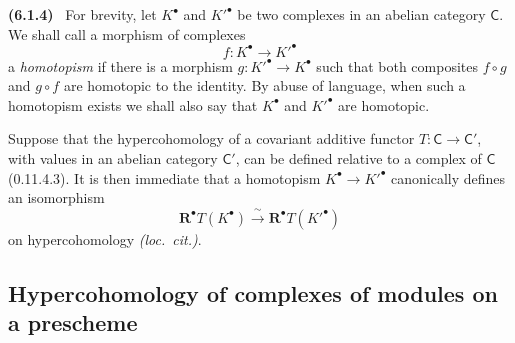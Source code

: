 \documentclass[10pt,oneside]{book}
\newcommand{\sref}[2][]{(#2)}
\newenvironment{env}[1][]{\par\medskip\noindent\textbf{(#1)}\ }{\par}
\begin{document}
\begin{env}[6.1.4]
\label{III.6.1.4}
For brevity, let $K^\bullet$ and $K'^\bullet$ be two complexes in
an abelian category $\mathsf{C}$.  We shall call a morphism of
complexes
\[
  f:K^\bullet\longrightarrow K'^\bullet
\]
a \emph{homotopism} if there is a morphism
$g:K'^\bullet\to K^\bullet$ such that both composites
$f\circ g$ and $g\circ f$ are homotopic to the identity.  By abuse
of language, when such a homotopism exists we shall also say that
$K^\bullet$ and $K'^\bullet$ are homotopic.

Suppose that the hypercohomology of a covariant additive functor
$T:\mathsf{C}\to\mathsf{C}'$, with values in an abelian category
$\mathsf{C}'$, can be defined relative to a complex of
$\mathsf{C}$ \sref[0]{0.11.4.3}.  It is then immediate that a
homotopism $K^\bullet\to K'^\bullet$ canonically defines an
isomorphism
\[
  \mathbf{R}^\bullet T(K^\bullet)
  \xrightarrow{\ \sim\ }
  \mathbf{R}^\bullet T(K'^\bullet)
\]
on hypercohomology \emph{(loc.\ cit.)}.
\end{env}


\subsection{Hypercohomology of complexes of modules on a prescheme}
\label{subsection:III.6.2}
\end{document}
